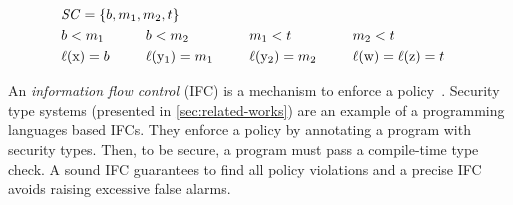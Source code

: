 \begin{center}
\begin{minipage}{.68\textwidth}
\begin{alignat*}{7}
& \SCset = \{b, m_1, m_2, t\} \span \span \\ %
& b < m_1 & \hspace{1.6em} & b < m_2 & \hspace{1.6em} & m_1 < t &\hspace{1.6em} & m_2 < t\\
& \lvl{\prc|x|} = b && \lvl{\prc|y$_1$|} = m_1 && \lvl{\prc|y$_2$|}= m_2 && \lvl{\prc|w|} =  \lvl{\prc|z|}  = t
\end{alignat*}
\end{minipage}\hfill%
\begin{minipage}{.3\textwidth}\hfill%
\end{minipage}
\end{center}

An \emph{information flow control} (IFC) is a mechanism to enforce a
policy~\cite{bishop2003}. Security type systems (presented in
\autoref{sec:related-works}) are an example of a programming languages based
IFCs. They enforce a policy by annotating a program with security types. Then,
to be secure, a program must pass a compile-time type check. A sound IFC
guarantees to find all policy violations and a precise IFC avoids raising
excessive false alarms.

